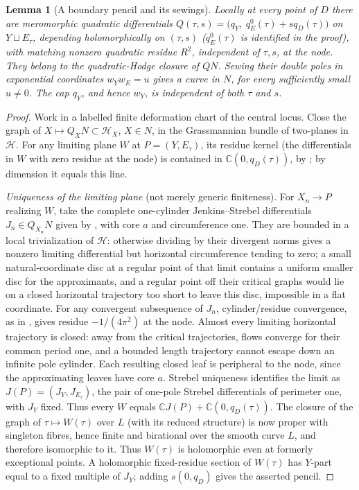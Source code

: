 \documentclass[11pt]{article}
\newtheorem{lemma}[theorem]{Lemma}
\theoremstyle{remark}
\begin{document}
\begin{lemma}[A boundary pencil and its sewings]\label{lem:cap-pencil}
Locally at every point of \(D\) there are meromorphic quadratic
differentials
\(Q(\tau,s)=\bigl(q_Y,\ q_E^0(\tau)+s q_D(\tau)\bigr)\)
on \(Y\sqcup E_\tau\), depending holomorphically on \((\tau,s)\)
(\(q_E^0(\tau)\) is identified in the proof),
with matching nonzero quadratic residue
\(R^2\), independent of \(\tau,s\), at the node.
They belong to the quadratic-Hodge closure of \(QN\).
Sewing their double poles in exponential coordinates
\(w_Yw_E=u\) gives a curve in \(N\), for every sufficiently
small \(u\ne0\). The cap \(q_Y\), and hence \(w_Y\), is
independent of both \(\tau\) and \(s\).
\end{lemma}
\begin{proof}
Work in a labelled finite deformation chart of the central
locus. Close the graph of \(X\mapsto Q_XN\subset\mathcal H_X\),
\(X\in N\), in the Grassmannian bundle of two-planes in
\(\mathcal H\). For any limiting plane \(W\) at \(P=(Y,E_\tau)\),
its residue kernel (the differentials in \(W\) with zero residue at
the node) is contained in \(\mathbb C(0,q_D(\tau))\), by
\cite[Corollaries 3.11--3.12 and the proof of Theorem 3.9]{AHW};
by dimension it equals this line.

\emph{Uniqueness of the limiting plane} (not merely generic
finiteness). For \(X_n\to P\) realizing \(W\), take the complete
one-cylinder
Jenkins--Strebel differentials \(J_n\in Q_{X_n}N\)
given by \cite[Corollary 2.7]{AHW}, with core \(a\)
and circumference one.
They are bounded in a local trivialization of \(\mathcal H\):
otherwise dividing by their divergent norms gives a nonzero
limiting differential but horizontal circumference tending
to zero; a small natural-coordinate disc at a regular
point of that limit contains a uniform smaller disc for
the approximants, and a regular point off their critical graphs
would lie on a closed horizontal trajectory too short
to leave this disc, impossible in a flat coordinate.
For any convergent subsequence of \(J_n\), cylinder/residue
convergence, as in \cite[Lemma 3.10]{AHW}, gives residue
\(-1/(4\pi^2)\) at the node. Almost every limiting horizontal
trajectory is closed: away from the critical trajectories,
flows converge for their common period one, and a bounded
length trajectory cannot escape down an infinite pole cylinder.
Each resulting closed leaf is peripheral to the node, since
the approximating leaves have core \(a\).
Strebel uniqueness \cite[Theorem 2]{Zvonkine} identifies the
limit as \(J(P)=(J_Y,J_{E_\tau})\),
the pair of one-pole Strebel differentials of perimeter one,
with \(J_Y\) fixed. Thus every \(W\) equals
\(\mathbb C J(P)+\mathbb C(0,q_D(\tau))\).
The closure of the graph of \(\tau\mapsto W(\tau)\) over \(L\)
(with its reduced structure) is now proper with singleton
fibres, hence finite and birational over the smooth curve
\(L\), and therefore isomorphic to it. Thus \(W(\tau)\) is
holomorphic even at formerly exceptional points.
A holomorphic fixed-residue section of \(W(\tau)\) has
\(Y\)-part equal to a fixed multiple of \(J_Y\); adding
\(s(0,q_D)\) gives the asserted pencil.


\end{proof}
\end{document}
